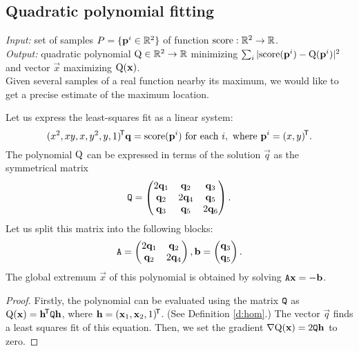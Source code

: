 \subsection{Quadratic polynomial fitting}
\textit{Input:} set of samples $P = \{\mathbf{p}^i \in \mathbb{R}^2 \}$ of function $\textrm{score}: \mathbb{R}^2 \to \mathbb{R}$.\\
\textit{Output:} quadratic polynomial $\mathrm{Q} \in \mathbb{R}^2 \to \mathbb{R}$ minimizing $\sum_i |\mathrm{score}(\mathbf{p}^i) - \mathrm{Q}(\mathbf{p}^i)|^2$ and vector $\vec x$ maximizing $\mathrm{Q}(\mathbf{x})$.\\

Given several samples of a real function nearby its maximum, we would like to get a precise estimate of the maximum location.

Let us express the least-squares fit as a linear system:
$$(x^2, xy, x, y^2, y, 1)^{\!\mathsf{T}} \mathbf{q} = \mathrm{score}(\mathbf{p}^i) \text{ for each } i, \text{ where } \mathbf{p}^i = (x, y)^{\!\mathsf{T}}.$$
The polynomial $\mathrm{Q}$ can be expressed in terms of the solution $\vec q$ as the symmetrical matrix
$$\mathtt{Q} = \begin{pmatrix}
 2 \mathbf{q}_1 & \mathbf{q}_2 & \mathbf{q}_3 \\
 \mathbf{q}_2 & 2 \mathbf{q}_4 & \mathbf{q}_5 \\
 \mathbf{q}_3 & \mathbf{q}_5 & 2 \mathbf{q}_6
\end{pmatrix}.$$
Let us split this matrix into the following blocks:
\begin{equation}
\mathtt{A} = \begin{pmatrix}
 2 \mathbf{q}_1 & \mathbf{q}_2 \\
 \mathbf{q}_2 & 2 \mathbf{q}_4 \\
\end{pmatrix},
\mathbf{b} = \begin{pmatrix}
 \mathbf{q}_3 \\
 \mathbf{q}_5 \\
\end{pmatrix}.
\end{equation}
The global extremum $\vec x$ of this polynomial is obtained by solving $\mathtt{A} \mathbf{x} = -\mathbf{b}$.

\begin{proof}
Firstly, the polynomial can be evaluated using the matrix $\mathtt{Q}$ as $\mathrm{Q}(\mathbf{x}) = \mathbf{h}^{\!\mathsf{T}} \mathtt{Q} \mathbf{h}$, where $\mathbf{h} = (\mathbf{x}_1, \mathbf{x}_2, 1)^{\!\mathsf{T}}$.
(See Definition \ref{d:hom}.)
The vector $\vec q$ finds a least squares fit of this equation.
Then, we set the gradient $\nabla \mathrm{Q}(\mathbf{x}) = 2\mathtt{Q} \mathbf{h}$ to zero.
\end{proof}

